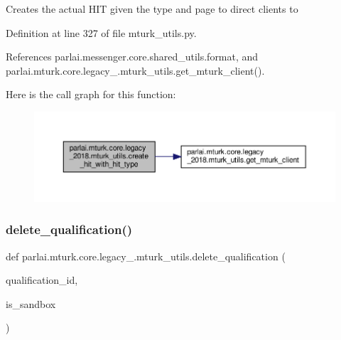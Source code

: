 \begin{DoxyVerb}Creates the actual HIT given the type and page to direct clients to\end{DoxyVerb}
 

Definition at line 327 of file mturk\+\_\+utils.\+py.



References parlai.\+messenger.\+core.\+shared\+\_\+utils.\+format, and parlai.\+mturk.\+core.\+legacy\+\_.\+mturk\+\_\+utils.\+get\+\_\+mturk\+\_\+client().

Here is the call graph for this function\+:
\nopagebreak
\begin{figure}[H]
\begin{center}
\leavevmode
\includegraphics[width=350pt]{namespaceparlai_1_1mturk_1_1core_1_1legacy__2018_1_1mturk__utils_a98f3bb533401557bf8156d1b5b268df3_cgraph}
\end{center}
\end{figure}
\mbox{\label{namespaceparlai_1_1mturk_1_1core_1_1legacy__2018_1_1mturk__utils_a5c70873375e623d8d95012fa4cde22d1}} 
\subsubsection{\texorpdfstring{delete\+\_\+qualification()}{delete\_qualification()}}
{\footnotesize\ttfamily def parlai.\+mturk.\+core.\+legacy\+\_.\+mturk\+\_\+utils.\+delete\+\_\+qualification (\begin{DoxyParamCaption}\item[{}]{qualification\+\_\+id,  }\item[{}]{is\+\_\+sandbox }\end{DoxyParamCaption})}

